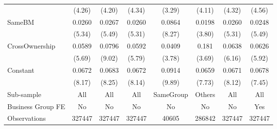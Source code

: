 {\begin{tabular}{l*{7}{c}}
                    &      (4.26)         &      (4.20)         &      (4.34)         &      (3.29)         &      (4.11)         &      (4.32)         &      (4.56)         \\
[1em]
SameBM              &      0.0260\sym{***}&      0.0267\sym{***}&      0.0260\sym{***}&      0.0864\sym{***}&      0.0198\sym{***}&      0.0260\sym{***}&      0.0248\sym{***}\\
                    &      (5.34)         &      (5.49)         &      (5.31)         &      (8.27)         &      (3.80)         &      (5.31)         &      (5.49)         \\
[1em]
CrossOwnership      &      0.0589\sym{***}&      0.0796\sym{***}&      0.0592\sym{***}&      0.0409\sym{***}&       0.181\sym{***}&      0.0638\sym{***}&      0.0626\sym{***}\\
                    &      (5.69)         &      (9.02)         &      (5.79)         &      (3.78)         &      (3.69)         &      (6.16)         &      (5.92)         \\
[1em]
Constant            &      0.0672\sym{***}&      0.0683\sym{***}&      0.0672\sym{***}&      0.0914\sym{***}&      0.0659\sym{***}&      0.0671\sym{***}&      0.0678\sym{***}\\
                    &      (8.17)         &      (8.25)         &      (8.14)         &      (9.89)         &      (7.73)         &      (8.12)         &      (7.45)         \\
\hline
Sub-sample          &         All         &         All         &         All         &   SameGroup         &      Others         &         All         &         All         \\
Business Group FE   &          No         &          No         &          No         &          No         &          No         &          No         &         Yes         \\
Observations        &      327447         &      327447         &      327447         &       40605         &      286842         &      327447         &      327447         \\
\hline\hline  \end{tabular}}
